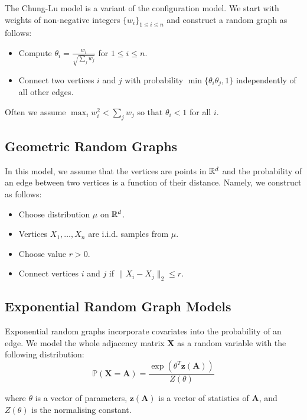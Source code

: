 \documentclass{article}
\begin{document}
The Chung-Lu model is a variant of the configuration model. We start with weights of non-negative integers $\{w_i\}_{1\leq i \leq n}$ and construct a random graph as follows:
\begin{itemize}
    \item Compute $\theta_i = \frac{w_i}{\sqrt{\sum_j w_j}}$ for $1\leq i \leq n$.
    \item Connect two vertices $i$ and $j$ with probability $\min \{\theta_i \theta_j, 1\}$ independently of all other edges.
\end{itemize}

Often we assume $\max_i w_i^2 < \sum_j w_j$ so that $\theta_i < 1$ for all $i$.

\subsection{Geometric Random Graphs}
In this model, we assume that the vertices are points in $\mathbb{R}^d$ and the probability of an edge between two vertices is a function of their distance. Namely, we construct as follows:
\begin{itemize}
    \item Choose distribution $\mu$ on $\mathbb{R}^d$.
    \item Vertices $X_1,\ldots,X_n$ are i.i.d. samples from $\mu$.
    \item Choose value $r>0$.
    \item Connect vertices $i$ and $j$ if $\|X_i-X_j\|_2\leq r$.
\end{itemize}


\subsection{Exponential Random Graph Models}
Exponential random graphs incorporate covariates into the probability of an edge. We model the whole adjacency matrix $\mathbf{X}$ as a random variable with the following distribution:
\begin{equation*}
    \mathbb{P}(\mathbf{X}=\mathbf{A}) = \frac{\exp(\theta^T \mathbf{z}(\mathbf{A}))}{Z(\theta)}
\end{equation*}

where $\theta$ is a vector of parameters, $\mathbf{z}(\mathbf{A})$ is a vector of statistics of $\mathbf{A}$, and $Z(\theta)$ is the normalising constant. 




\end{document}
